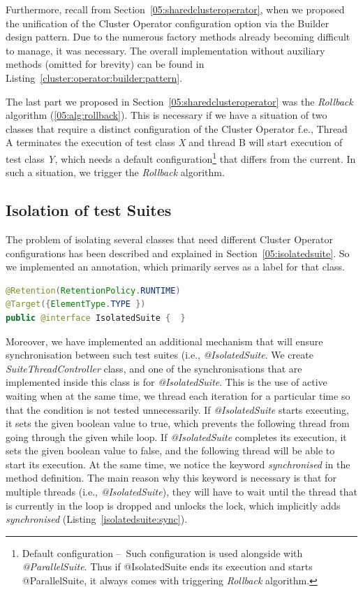 Furthermore, recall from Section~\ref{05:sharedclusteroperator}, when we proposed the unification of the Cluster Operator configuration
option via the Builder design pattern.
Due to the numerous factory methods already becoming difficult to manage, it was necessary.
The overall implementation without auxiliary methods (omitted for brevity) can be found in Listing~\ref{cluster:operator:builder:pattern}.

The last part we proposed in Section~\ref{05:sharedclusteroperator} was the \emph{Rollback} algorithm (\ref{05:alg:rollback}).
This is necessary if we have a situation of two classes that require a distinct configuration of the Cluster Operator f.e.,
Thread A terminates the execution of test class \emph{X} and thread B will start execution of test class \emph{Y},
which needs a default configuration\footnote{Default configuration \---\ Such configuration is used alongside with \emph{@ParallelSuite}.
Thus if @IsolatedSuite ends its execution and starts @ParallelSuite, it always comes with triggering \emph{Rollback} algorithm.} that differs from the current.
In such a situation, we trigger the \emph {Rollback} algorithm.

\subsection{Isolation of test Suites}
\label{05:sub:sec:isolation:of:test:suites}

The problem of isolating several classes that need different Cluster Operator configurations has been described and explained in Section~\ref{05:isolatedsuite}.
So we implemented an annotation, which primarily serves as a label for that class.
\begin{lstlisting}[language=Java,label=annotation:isolatedsuite,caption=Implementation of the @IsolatedSuite annotation,frame=tb]
@Retention(RetentionPolicy.RUNTIME)
@Target({ElementType.TYPE })
public @interface IsolatedSuite {  }
\end{lstlisting}
Moreover, we have implemented an additional mechanism that will ensure synchronisation between such test suites
(i.e., \emph{@IsolatedSuite}. We create \emph{SuiteThreadController} class, and one of the synchronisations that are
implemented inside this class is for \emph {@IsolatedSuite}. This is the use of active waiting when at the same time,
we thread each iteration for a particular time so that the condition is not tested unnecessarily. If \emph{@IsolatedSuite}
starts executing, it sets the given boolean value to true, which prevents the following thread from going through the
given while loop. If \emph{@IsolatedSuite} completes its execution, it sets the given boolean value to false, and
the following thread will be able to start its execution. At the same time, we notice the keyword \emph{synchronised}
in the method definition. The main reason why this keyword is necessary is that for multiple threads (i.e., \emph{@IsolatedSuite}),
they will have to wait until the thread that is currently in the loop is dropped and unlocks the lock, which implicitly
adds \emph {synchronised} (Listing~\ref{isolatedsuite:sync}).

